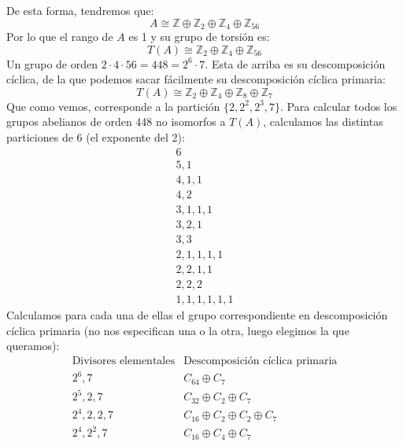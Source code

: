 \begin{ejemplo}
    De esta forma, tendremos que:
    \begin{equation*}
        A \cong \mathbb{Z} \oplus \mathbb{Z}_2 \oplus \mathbb{Z}_4 \oplus \mathbb{Z}_{56}
    \end{equation*}
    Por lo que el rango de $A$ es 1 y su grupo de torsión es:
    \begin{equation*}
        T(A) \cong \mathbb{Z}_2 \oplus \mathbb{Z}_4 \oplus \mathbb{Z}_{56}
    \end{equation*}
    Un grupo de orden $2\cdot 4\cdot 56 = 448 = 2^6\cdot 7$. Esta de arriba es su descomposición cíclica, de la que podemos sacar fácilmente su descomposición cíclica primaria:
    \begin{equation*}
        T(A) \cong \mathbb{Z}_2 \oplus \mathbb{Z}_4 \oplus \mathbb{Z}_8 \oplus \mathbb{Z}_7
    \end{equation*}
    Que como vemos, corresponde a la partición $\{2, 2^2, 2^3, 7\}$. Para calcular todos los grupos abelianos de orden 448 no isomorfos a $T(A)$, calculamos las distintas particiones de 6 (el exponente del 2):
    \begin{gather*}
        6 \\
        5, 1 \\
        4, 1, 1 \\
        4, 2 \\
        3, 1, 1, 1 \\
        3, 2, 1 \\
        3, 3 \\
        2, 1, 1, 1, 1 \\
        2, 2, 1, 1 \\
        2, 2, 2 \\
        1, 1, 1, 1, 1, 1
    \end{gather*}
    Calculamos para cada una de ellas el grupo correspondiente en descomposición cíclica primaria (no nos especifican una o la otra, luego elegimos la que queramos):
    \begin{equation*}
        \begin{array}{c|c}
            \text{Divisores elementales} & \text{Descomposición cíclica primaria}\\
            \hline
        2^6, 7 & C_{64} \oplus C_7 \\
        2^5, 2, 7 & C_{32} \oplus C_2 \oplus C_7 \\
        2^4, 2, 2, 7 & C_{16} \oplus C_2 \oplus C_2 \oplus C_7 \\
        2^4, 2^2, 7 & C_{16} \oplus C_4 \oplus C_7 \\

\end{array}
\end{equation*}
\end{ejemplo}
